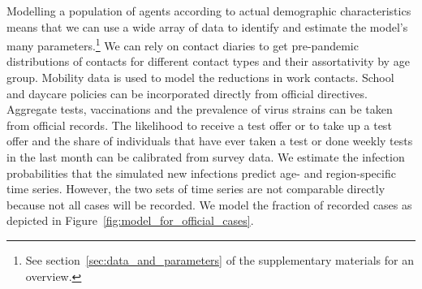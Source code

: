 Modelling a population of agents according to actual demographic characteristics means
that we can use a wide array of data to identify and estimate the model's many
parameters.\footnote{See section~\ref{sec:data_and_parameters} of the supplementary
materials for an overview.} We can rely on contact diaries to get pre-pandemic
distributions of contacts for different contact types and their assortativity by age
group. Mobility data is used to model the reductions in work contacts. School and daycare
policies can be incorporated directly from official directives. Aggregate tests,
vaccinations and the prevalence of virus strains can be taken from official records. The
likelihood to receive a test offer or to take up a test offer and the share of
individuals that have ever taken a test or done weekly tests in the last month can be
calibrated from survey data. We estimate
the infection probabilities that the simulated new
infections predict age- and region-specific time series. However, the two sets of time series are not comparable
directly because not all cases will be recorded. We model the fraction of recorded cases
as depicted in Figure~\ref{fig:model_for_official_cases}.

